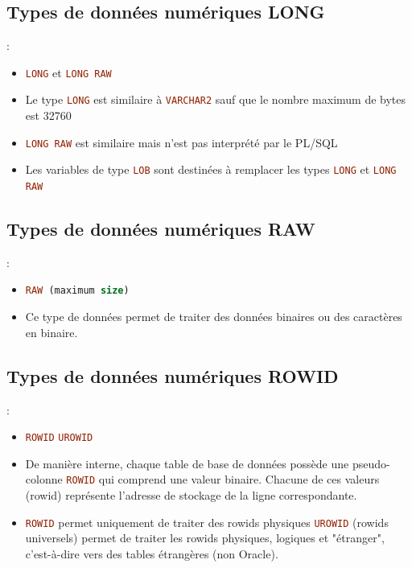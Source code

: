 \documentclass[10pt]{beamer}
\begin{document}
\subsection{Types de données numériques LONG}
\begin{frame}{\secname : \subsecname}
    \begin{itemize}
        \item \lstinline[language=sql]!LONG! et \lstinline[language=sql]!LONG RAW!
        \item Le type \lstinline[language=sql]!LONG! est similaire à \lstinline[language=sql]!VARCHAR2! sauf que le nombre maximum de bytes est 32760
        \item \lstinline[language=sql]!LONG RAW! est similaire mais n'est pas interprété par le PL/SQL
        \item Les variables de type \lstinline[language=sql]!LOB! sont destinées à remplacer les types \lstinline[language=sql]!LONG! et \lstinline[language=sql]!LONG RAW!
    \end{itemize}
\end{frame}

\subsection{Types de données numériques RAW}
\begin{frame}{\secname : \subsecname}
    \begin{itemize}
        \item \lstinline[language=sql]!RAW (maximum size)!
        \item Ce type de données permet de traiter des données binaires ou des caractères en binaire.
    \end{itemize}
\end{frame}

\subsection{Types de données numériques ROWID}
\begin{frame}{\secname : \subsecname}
    \begin{itemize}
        \item \lstinline[language=sql]!ROWID! \lstinline[language=sql]!UROWID!
        \item De manière interne, chaque table de base de données possède une pseudo-colonne \lstinline[language=sql]!ROWID! qui comprend une valeur binaire.  Chacune de ces valeurs (rowid) représente l'adresse de stockage de la ligne correspondante.
        \item \lstinline[language=sql]!ROWID! permet uniquement de traiter des rowids physiques \lstinline[language=sql]!UROWID! (rowids universels) permet de traiter les rowids physiques, logiques et "étranger", c'est-à-dire vers des tables étrangères (non Oracle).
    \end{itemize}
    
\end{frame}
\end{document}

